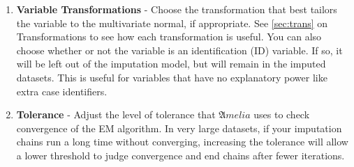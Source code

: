 \documentclass[12pt,titlepage]{article}
\newcommand{\Amelia}{\ensuremath{\mathfrak Amelia} }
\begin{document}
\begin{enumerate}
\item \textbf{Variable Transformations} - Choose the transformation
  that best tailors the variable to the multivariate normal, if appropriate.  See \ref{sec:trans} on Transformations to see how each transformation is
  useful.  You can also choose whether or not the variable is an identification (ID) variable.  If so, it will be left out of the imputation model, but
  will remain in the imputed datasets.  This is useful for variables that have
  no explanatory power like extra case identifiers.
\item \textbf{Tolerance} - Adjust the level of tolerance that \Amelia
  uses to check convergence of the EM algorithm.  In very large datasets, if your imputation chains run a long time without converging, increasing the tolerance will allow a lower threshold to judge convergence and end chains after fewer iterations. 
\end{enumerate}
\end{document}
